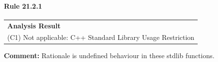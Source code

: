 \paragraph{Rule 21.2.1}
\begin{longtable}{p{13cm}}
\textbf{Analysis Result} \\
(C1) Not applicable: C++ Standard Library Usage Restriction \\
\end{longtable}
\textbf{Comment:} Rationale is undefined behaviour in these stdlib functions. \\
